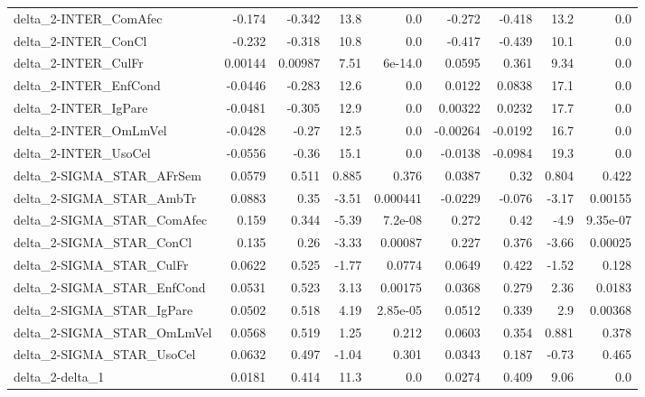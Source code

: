 \begin{tabular}{lrrrrrrrr}
delta\_2-INTER\_ComAfec                 &      -0.174 &       -0.342 &     13.8 &      0.0 &     -0.272 &      -0.418 &         13.2 &           0.0 \\
delta\_2-INTER\_ConCl                   &      -0.232 &       -0.318 &     10.8 &      0.0 &     -0.417 &      -0.439 &         10.1 &           0.0 \\
delta\_2-INTER\_CulFr                   &     0.00144 &      0.00987 &     7.51 &  6e-14.0 &     0.0595 &       0.361 &         9.34 &           0.0 \\
delta\_2-INTER\_EnfCond                 &     -0.0446 &       -0.283 &     12.6 &      0.0 &     0.0122 &      0.0838 &         17.1 &           0.0 \\
delta\_2-INTER\_IgPare                  &     -0.0481 &       -0.305 &     12.9 &      0.0 &    0.00322 &      0.0232 &         17.7 &           0.0 \\
delta\_2-INTER\_OmLmVel                 &     -0.0428 &        -0.27 &     12.5 &      0.0 &   -0.00264 &     -0.0192 &         16.7 &           0.0 \\
delta\_2-INTER\_UsoCel                  &     -0.0556 &        -0.36 &     15.1 &      0.0 &    -0.0138 &     -0.0984 &         19.3 &           0.0 \\
delta\_2-SIGMA\_STAR\_AFrSem             &      0.0579 &        0.511 &    0.885 &    0.376 &     0.0387 &        0.32 &        0.804 &         0.422 \\
delta\_2-SIGMA\_STAR\_AmbTr              &      0.0883 &         0.35 &    -3.51 & 0.000441 &    -0.0229 &      -0.076 &        -3.17 &       0.00155 \\
delta\_2-SIGMA\_STAR\_ComAfec            &       0.159 &        0.344 &    -5.39 &  7.2e-08 &      0.272 &        0.42 &         -4.9 &      9.35e-07 \\
delta\_2-SIGMA\_STAR\_ConCl              &       0.135 &         0.26 &    -3.33 &  0.00087 &      0.227 &       0.376 &        -3.66 &       0.00025 \\
delta\_2-SIGMA\_STAR\_CulFr              &      0.0622 &        0.525 &    -1.77 &   0.0774 &     0.0649 &       0.422 &        -1.52 &         0.128 \\
delta\_2-SIGMA\_STAR\_EnfCond            &      0.0531 &        0.523 &     3.13 &  0.00175 &     0.0368 &       0.279 &         2.36 &        0.0183 \\
delta\_2-SIGMA\_STAR\_IgPare             &      0.0502 &        0.518 &     4.19 & 2.85e-05 &     0.0512 &       0.339 &          2.9 &       0.00368 \\
delta\_2-SIGMA\_STAR\_OmLmVel            &      0.0568 &        0.519 &     1.25 &    0.212 &     0.0603 &       0.354 &        0.881 &         0.378 \\
delta\_2-SIGMA\_STAR\_UsoCel             &      0.0632 &        0.497 &    -1.04 &    0.301 &     0.0343 &       0.187 &        -0.73 &         0.465 \\
delta\_2-delta\_1                       &      0.0181 &        0.414 &     11.3 &      0.0 &     0.0274 &       0.409 &         9.06 &           0.0 \\
\bottomrule
\end{tabular}
